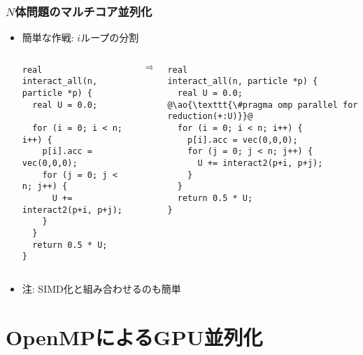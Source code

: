 \documentclass[10pt,dvipdfmx]{beamer}
\newcommand{\ao}[1]{{\color{blue}#1}}
\begin{document}
\begin{frame}[fragile]
\frametitle{$N$体問題のマルチコア並列化}
\begin{itemize}
\item 簡単な作戦: $i$ループの分割

\begin{columns}
\begin{column}{0.48\textwidth}
\begin{lstlisting}
real
interact_all(n, particle *p) {
  real U = 0.0;

  for (i = 0; i < n; i++) {
    p[i].acc = vec(0,0,0);
    for (j = 0; j < n; j++) {
      U += interact2(p+i, p+j);
    }
  }
  return 0.5 * U;
}
\end{lstlisting}
\end{column}
\begin{column}{0.05\textwidth}
$\Rightarrow$
\end{column}
\begin{column}{0.48\textwidth}
\begin{lstlisting}
real
interact_all(n, particle *p) {
  real U = 0.0;
@\ao{\texttt{\#pragma omp parallel for reduction(+:U)}}@
  for (i = 0; i < n; i++) {
    p[i].acc = vec(0,0,0);
    for (j = 0; j < n; j++) {
      U += interact2(p+i, p+j);
    }
  }
  return 0.5 * U;
}
\end{lstlisting}
\end{column}
\end{columns}
\item [] 注: SIMD化と組み合わせるのも簡単
\end{itemize}
\end{frame}


\section{OpenMPによるGPU並列化}
\end{document}
